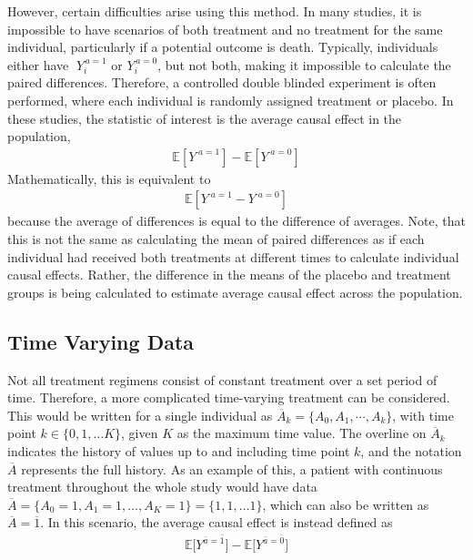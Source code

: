 However, certain difficulties arise using this method.  In many studies, it is impossible to have scenarios of both treatment and no treatment for the same individual, particularly if a potential outcome is death.  Typically, individuals either have $\; Y_i^{\, a=1}$ or  $Y_i^{\, a=0}$, but not both, making it impossible to calculate the paired differences.  Therefore, a controlled double blinded experiment is often performed, where each individual is randomly assigned treatment or placebo.  In these studies, the statistic of interest is the average causal effect in the population, 
\begin{align}  \mathbb{E}[Y^{\; a=1}] - \mathbb{E}[Y^{\; a=0}] \end{align} 
Mathematically, this is equivalent to 
\begin{align}  \mathbb{E}[Y^{\; a=1} - Y^{\; a=0}] \end{align}  
because the average of differences is equal to the difference of averages.\cite{hernan_robins_2016} Note, that this is not the same as calculating the mean of paired differences as if each individual had received both treatments at different times to calculate individual causal effects.  Rather, the difference in the means of the placebo and treatment groups is being calculated to estimate average causal effect across the population.  

\subsection{Time Varying Data} \label{Time-varying}
Not all treatment regimens consist of constant treatment over a set period of time.  Therefore, a more complicated time-varying treatment can be considered.  This would be written for a single individual as $\overline{A}_k = \{A_0, A_1, \cdots, A_k \}$, with time point $k \in \{ 0, 1, \dots K\}$, given $K$ as the maximum time value.  The overline on $\overline{A}_k$ indicates the history of values up to and including time point $k$, and the notation $\overline{A}$ represents the full history.  As an example of this, a patient with continuous treatment throughout the whole study would have data $\overline{A} = \{A_0 = 1, A_1 = 1, \dots, A_K = 1 \}  = \{1,1,\dots 1 \}$, which can also be written as $\overline{A} = \overline{1}$.  In this scenario, the average causal effect is instead defined as 
\begin{align} \mathbb{E}\bigg[Y^{\bar{a} = \bar{1}}\bigg] -  \mathbb{E}\bigg[Y^{\bar{a} = \bar{0}}\bigg] \end{align} 

